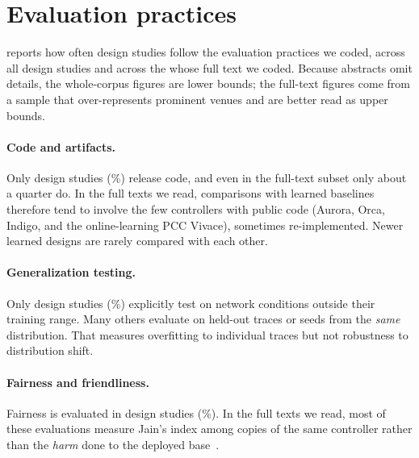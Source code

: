 \section{Evaluation practices}
\label{sec:practices}

 reports how often design studies follow the evaluation practices we coded, across all \nDesignN{} design studies and across the \nDesignFT{} whose full text we coded. Because abstracts omit details, the whole-corpus figures are lower bounds; the full-text figures come from a sample that over-represents prominent venues and are better read as upper bounds.

\begin{table}[t]
\centering
\caption{Evaluation practices of design studies: all \nDesignN{} design studies and the \nDesignFT{} coded from full texts. ``Tested on conditions outside the training range'' requires an explicit train/test split along at least one network parameter.}
\label{tab:practices}
\small

\end{table}

\paragraph{Code and artifacts.} Only \nPracCodeOrArtifactReleasedAll{} design studies (\nPctCodeDesign\%) release code, and even in the full-text subset only about a quarter do. In the full texts we read, comparisons with learned baselines therefore tend to involve the few controllers with public code (Aurora, Orca, Indigo, and the online-learning PCC Vivace), sometimes re-implemented. Newer learned designs are rarely compared with each other.

\paragraph{Generalization testing.} Only \nPracTestedOnConditionsOutsidAll{} design studies (\nPctGen\%) explicitly test on network conditions outside their training range. Many others evaluate on held-out traces or seeds from the \emph{same} distribution. That measures overfitting to individual traces but not robustness to distribution shift.

\paragraph{Fairness and friendliness.} Fairness is evaluated in \nPracFairnessOrTcpFriendlinesAll{} design studies (\nPctFair\%). In the full texts we read, most of these evaluations measure Jain's index among copies of the same controller rather than the \emph{harm} done to the deployed base~\cite{ware2019beyond}.

